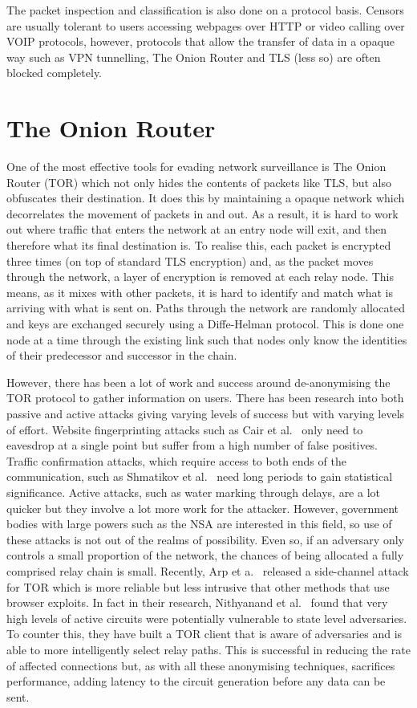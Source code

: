 \documentclass[ %
                    author={Samuel Russell},
                supervisor={Prof. Bogdan Warinschi},
                    degree={MEng},
                     title={Innocuous Ciphertexts},
                  subtitle={The DE-CENSOR Scheme},
                      type={research},
                      year={2018} ]{dissertation}
\begin{document}
The packet inspection and classification is also done on a protocol basis. Censors are usually tolerant to users accessing webpages over HTTP or video calling over VOIP protocols, however, protocols that allow the transfer of data in a opaque way such as VPN tunnelling, The Onion Router and TLS (less so) are often blocked completely.

\section{The Onion Router}

One of the most effective tools for evading network surveillance is The Onion Router (TOR) which not only hides the contents of packets like TLS, but also obfuscates their destination. It does this by maintaining a opaque network which decorrelates the movement of packets in and out. As a result, it is hard to work out where traffic that enters the network at an entry node will exit, and then therefore what its final destination is. To realise this, each packet is encrypted three times (on top of standard TLS encryption) and, as the packet moves through the network, a layer of encryption is removed at each relay node. This means, as it mixes with other packets, it is hard to identify and match what is arriving with what is sent on. Paths through the network are randomly allocated and keys are exchanged securely using a Diffe-Helman protocol. This is done one node at a time through the existing link such that nodes only know the identities of their predecessor and successor in the chain. 

However, there has been a lot of work and success around de-anonymising the TOR protocol to gather information on users. There has been research into both passive and active attacks giving varying levels of success but with varying levels of effort. Website fingerprinting attacks such as Cair et al.~\cite{webfinger} only need to eavesdrop at a single point but suffer from a high number of false positives. Traffic confirmation attacks, which require access to both ends of the communication, such as Shmatikov et al.~\cite{conf} need long periods to gain statistical significance. Active attacks, such as water marking through delays, are a lot quicker but they involve a lot more work for the attacker. However, government bodies with large powers such as the NSA are interested in this field, so use of these attacks is not out of the realms of possibility. Even so, if an adversary only controls a small proportion of the network, the chances of being allocated a fully comprised relay chain is small. Recently, Arp et a.~\cite{torben} released a side-channel attack for TOR which is more reliable but less intrusive that other methods that use browser exploits. In fact in their research, Nithyanand et al.~\cite{AS} found that very high levels of active circuits were potentially vulnerable to state level adversaries. To counter this, they have built a TOR client that is aware of adversaries and is able to more intelligently select relay paths. This is successful in reducing the rate of affected connections but, as with all these anonymising techniques, sacrifices performance, adding latency to the circuit generation before any data can be sent.
\end{document}
